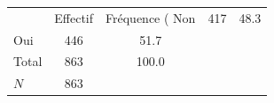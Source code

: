 {
\def\sym#1{\ifmmode^{#1}\else\(^{#1}\)\fi}
\begin{tabular}{l*{1}{cc}}
\toprule
            &    Effectif&Fréquence (%
\midrule
Non         &         417&        48.3\\
Oui         &         446&        51.7\\
Total       &         863&       100.0\\
\midrule
\(N\)       &         863&            \\
\bottomrule
\end{tabular}
}
